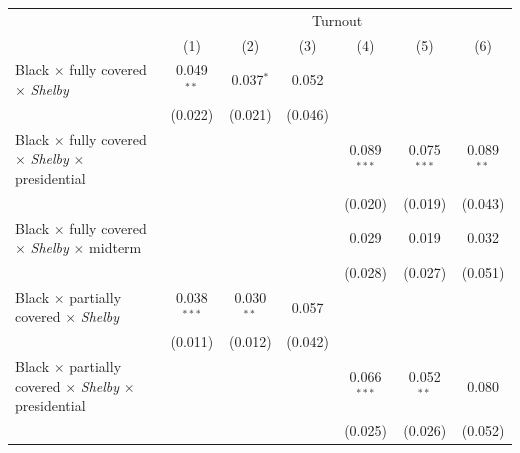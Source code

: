 
\begingroup
\centering
\begin{tabular}{lcccccc}
   \toprule
    & \multicolumn{6}{c}{Turnout}\\
                                                                                       & (1)           & (2)           & (3)           & (4)           & (5)           & (6)\\  
   \midrule 
   Black $\times$ fully covered $\times$ \textit{Shelby}                               & 0.049$^{**}$  & 0.037$^{*}$   & 0.052         &               &               &   \\   
                                                                                       & (0.022)       & (0.021)       & (0.046)       &               &               &   \\   
   Black $\times$ fully covered $\times$ \textit{Shelby} $\times$ presidential         &               &               &               & 0.089$^{***}$ & 0.075$^{***}$ & 0.089$^{**}$\\   
                                                                                       &               &               &               & (0.020)       & (0.019)       & (0.043)\\   
   Black $\times$ fully covered $\times$ \textit{Shelby} $\times$ midterm              &               &               &               & 0.029         & 0.019         & 0.032\\   
                                                                                       &               &               &               & (0.028)       & (0.027)       & (0.051)\\   
   Black $\times$ partially covered $\times$ \textit{Shelby}                           & 0.038$^{***}$ & 0.030$^{**}$  & 0.057         &               &               &   \\   
                                                                                       & (0.011)       & (0.012)       & (0.042)       &               &               &   \\   
   Black $\times$ partially covered $\times$ \textit{Shelby} $\times$ presidential     &               &               &               & 0.066$^{***}$ & 0.052$^{**}$  & 0.080\\   
                                                                                       &               &               &               & (0.025)       & (0.026)       & (0.052)\\   

\end{tabular}
